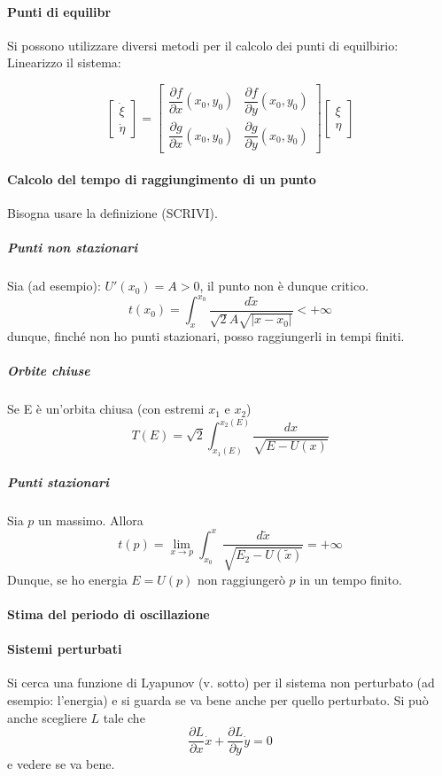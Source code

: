 \documentclass[a4paper,12pt]{article}
\begin{document}
\paragraph{Punti di equilibr}
Si possono utilizzare diversi metodi per il calcolo dei punti di equilbirio:
Linearizzo il sistema:

$$
\begin{bmatrix}
 \dot{\xi} \\ \dot{\eta}
\end{bmatrix}
= 
\begin{bmatrix}
 \dfrac{\partial f}{\partial x} (x_0, y_0) & \dfrac{\partial f}{\partial y} (x_0, y_0) \\
 \dfrac{\partial g}{\partial x} (x_0, y_0) & \dfrac{\partial g}{\partial y} (x_0, y_0)
\end{bmatrix}
\begin{bmatrix}
 \xi \\ \eta
\end{bmatrix}
$$

\paragraph{Calcolo del tempo di raggiungimento di un punto}
Bisogna usare la definizione (SCRIVI).
\subparagraph{Punti non stazionari}
Sia (ad esempio): $U'(x_0) = A > 0$, il punto non è dunque critico.
$$t(x_0) = \int_x^{x_0} \dfrac{d\tilde{x}}{\sqrt{2}A\sqrt{|x-x_0|}} < +\infty$$
dunque, finché non ho punti stazionari, posso raggiungerli in tempi finiti.
\subparagraph{Orbite chiuse}
Se E è un'orbita chiusa (con estremi $x_1$ e $x_2$)
$$ T(E) = \sqrt{2}\int_{x_1(E)}^{x_2(E)} \dfrac{dx}{\sqrt{E-U(x)}}$$
\subparagraph{Punti stazionari}
Sia $p$ un massimo.
Allora
$$t(p) = \lim_{x\to p} \int_{x_0}^x \dfrac{d\tilde{x}}{\sqrt{E_2 - U(\tilde{x})}} = +\infty$$
Dunque, se ho energia $E = U(p)$ non raggiungerò $p$ in un tempo finito.

\paragraph{Stima del periodo di oscillazione}


\paragraph{Sistemi perturbati}
Si cerca una funzione di Lyapunov (v. sotto) per il sistema non perturbato (ad esempio: l'energia) e si guarda se va bene anche per quello perturbato. Si può anche scegliere $L$ tale che $$\dfrac{\partial L}{\partial x}\dot{x} + \dfrac{\partial L}{\partial y}\dot{y} = 0 $$ e vedere se va bene.
\end{document}
